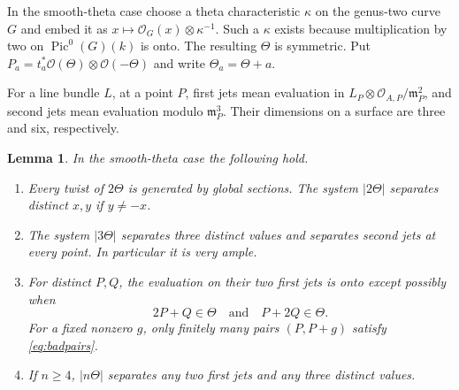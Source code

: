 \documentclass[11pt]{article}
\newtheorem{lemma}[theorem]{Lemma}
\theoremstyle{definition}\newtheorem{definition}[theorem]{Definition}
\theoremstyle{remark}\newtheorem{remark}[theorem]{Remark}
\newcommand{\OO}{\mathcal O}
\newcommand{\Pic}{\operatorname{Pic}}
\begin{document}
In the smooth-theta case choose a theta characteristic $\kappa$ on the genus-two curve $G$ and embed it as $x\mapsto\OO_G(x)\otimes\kappa^{-1}$. Such a $\kappa$ exists because multiplication by two on $\Pic^0(G)(k)$ is onto. The resulting $\Theta$ is symmetric. Put $P_a=t_a^*\OO(\Theta)\otimes\OO(-\Theta)$ and write $\Theta_a=\Theta+a$.

For a line bundle $L$, at a point $P$, first jets mean evaluation in $L_P\otimes\OO_{A,P}/\mathfrak m_P^2$, and second jets mean evaluation modulo $\mathfrak m_P^3$. Their dimensions on a surface are three and six, respectively.

\begin{lemma}\label{lem:theta-jets}
In the smooth-theta case the following hold.
\begin{enumerate}
\item Every twist of $2\Theta$ is generated by global sections. The system $|2\Theta|$ separates distinct $x,y$ if $y\ne-x$.
\item The system $|3\Theta|$ separates three distinct values and separates second jets at every point. In particular it is very ample.
\item For distinct $P,Q$, the evaluation on their two first jets is onto except possibly when
\begin{equation}\label{eq:badpairs}
 2P+Q\in\Theta\quad\text{and}\quad P+2Q\in\Theta.
\end{equation}
For a fixed nonzero $g$, only finitely many pairs $(P,P+g)$ satisfy \eqref{eq:badpairs}.
\item If $n\ge4$, $|n\Theta|$ separates any two first jets and any three distinct values.
\end{enumerate}
\end{lemma}
\end{document}
